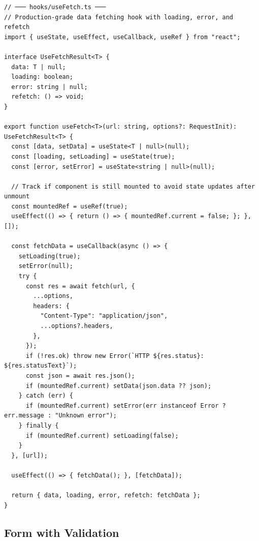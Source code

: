 \documentclass[10pt, a4paper]{article}
\begin{document}
\begin{lstlisting}[language=myjs]
// ─── hooks/useFetch.ts ───
// Production-grade data fetching hook with loading, error, and refetch
import { useState, useEffect, useCallback, useRef } from "react";

interface UseFetchResult<T> {
  data: T | null;
  loading: boolean;
  error: string | null;
  refetch: () => void;
}

export function useFetch<T>(url: string, options?: RequestInit): UseFetchResult<T> {
  const [data, setData] = useState<T | null>(null);
  const [loading, setLoading] = useState(true);
  const [error, setError] = useState<string | null>(null);
  
  // Track if component is still mounted to avoid state updates after unmount
  const mountedRef = useRef(true);
  useEffect(() => { return () => { mountedRef.current = false; }; }, []);
  
  const fetchData = useCallback(async () => {
    setLoading(true);
    setError(null);
    try {
      const res = await fetch(url, {
        ...options,
        headers: {
          "Content-Type": "application/json",
          ...options?.headers,
        },
      });
      if (!res.ok) throw new Error(`HTTP ${res.status}: ${res.statusText}`);
      const json = await res.json();
      if (mountedRef.current) setData(json.data ?? json);
    } catch (err) {
      if (mountedRef.current) setError(err instanceof Error ? err.message : "Unknown error");
    } finally {
      if (mountedRef.current) setLoading(false);
    }
  }, [url]);

  useEffect(() => { fetchData(); }, [fetchData]);

  return { data, loading, error, refetch: fetchData };
}
\end{lstlisting}


\subsection{Form with Validation}
\end{document}

